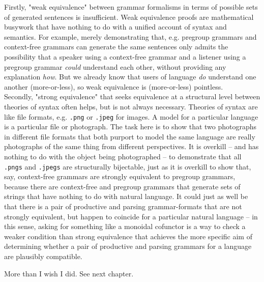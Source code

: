 Firstly, "weak equivalence" between grammar formalisms in terms of possible sets of generated sentences is insufficient. Weak equivalence proofs are mathematical busywork that have nothing to do with a unified account of syntax and semantics. For example, merely demonstrating that, e.g. pregroup grammars and context-free grammars can generate the same sentences \citep{buszkowskiPregroupGrammarsContextfreea} only admits the possibility that a speaker using a context-free grammar and a listener using a pregroup grammar \emph{could} understand each other, without providing any explanation \emph{how}. But we already know that users of language \emph{do} understand one another (more-or-less), so weak equivalence is (more-or-less) pointless.\\

Secondly, "strong equivalence" that seeks equivalence at a structural level between theories of syntax often helps, but is not always necessary. Theories of syntax are like file formats, e.g. \texttt{.png} or \texttt{.jpeg} for images. A model for a particular language is a particular file or photograph. The task here is to show that two photographs in different file formats that both purport to model the same language are really photographs of the same thing from different perspectives. It is overkill -- and has nothing to do with the object being photographed -- to demonstrate that all \texttt{.pngs} and \texttt{.jpegs} are structurally bijectable, just as it is overkill to show that, say, context-free grammars are strongly equivalent to pregroup grammars, because there are context-free and pregroup grammars that generate sets of strings that have nothing to do with natural language. It could just as well be that there is a pair of productive and parsing grammar-formats that are not strongly equivalent, but happen to coincide for a particular natural language -- in this sense, asking for something like a monoidal cofunctor is a way to check a weaker condition than strong equivalence that achieves the more specific aim of determining whether a pair of productive and parsing grammars for a language are plausibly compatible.

 More than I wish I did. See next chapter.